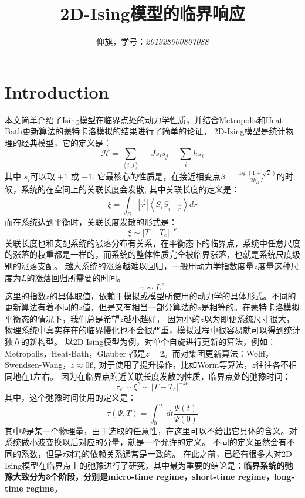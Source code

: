 \documentclass[a4paper]{article}
\begin{document}
\setlength{\leftskip}{20pt}

\title{2D-Ising模型的临界响应}
\author{仰旗，学号：{\it 201928000807088}}

 \maketitle

\section{Introduction}
本文简单介绍了Ising模型在临界点处的动力学性质，并结合Metropolis和Heat-Bath更新算法的蒙特卡洛模拟的结果进行了简单的论证。
\newline
2D-Ising模型是统计物理的经典模型，它的定义是：
$$\mathcal{H}=\sum_{\left\langle i,j\right\rangle}-Js_is_j-\sum_ihs_i$$
其中 $s_i$可以取 $+1$ 或 $-1$.
它最核心的性质是，在接近相变点$\beta=\frac{\log(1+\sqrt{2})}{2k_BJ}$的时候，系统的在空间上的关联长度会发散,
其中关联长度的定义是：
$$\xi=\int_{\Omega} |\vec{r}|\left\langle S_i S_{i+\vec{r}} \right\rangle dr$$
而在系统达到平衡时，关联长度发散的形式是：
$$\xi\sim|T-T_c|^{-\nu}$$
关联长度也和支配系统的涨落分布有关系，在平衡态下的临界点，系统中任意尺度的涨落的权重都是一样的，而系统的整体性质完全被临界涨落，也就是系统尺度级别的涨落支配。
越大系统的涨落越难以回归，一般用动力学指数度量$z$度量这种尺度为$L$的涨落回归所需要的时间。
$$\tau\sim L^{z}$$
这里的指数$z$的具体取值，依赖于模拟或模型所使用的动力学的具体形式。不同的更新算法有着不同的$z$值，但是又有相当一部分算法的$z$是相等的。在蒙特卡洛模拟平衡态的情况下，我们总是希望$z$越小越好，
因为小的$z$以为即便系统尺寸很大，物理系统中真实存在的临界慢化也不会很严重，模拟过程中很容易就可以得到统计独立的新构型。
以2D-Ising模型为例，对单个自旋进行更新的算法，例如：Metropolis，Heat-Bath，Glauber 都是$z=2$。而对集团更新算法：Wolff，Swendsen-Wang，$z\approx 0ß$,
对于使用了提升操作，比如Worm等算法，$z$往往各不相同地在$1$左右。
因为在临界点附近关联长度发散的性质，临界点处的弛豫时间：
$$\tau_c\sim \xi^z\sim|T-T_c|^{-z\nu}$$
其中，这个弛豫时间使用的定义是：
$$\tau(\Psi,T)=\int_{0}^{\infty}dt\frac{\Psi(t)}{\Psi(0)}$$
其中$\Psi$是某一个物理量，由于选取的任意性，在这里可以不给出它具体的含义。对系统做小波变换以后对应的分量，就是一个允许的定义。
不同的定义虽然会有不同的系数，但是$\tau$对$T_c$的依赖关系通常是一致的。
在此之前，已经有很多人对2D-Ising模型在临界点上的弛豫进行了研究，其中最为重要的结论是：\textbf{临界系统的弛豫大致分为3个阶段，分别是micro-time regime，short-time regime，long-time regime}。
\end{document}
